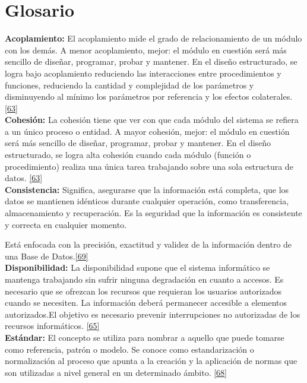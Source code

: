 
\chapter{Glosario}

\textbf {Acoplamiento:} 
El acoplamiento mide el grado de relacionamiento de un módulo con los demás. A menor acoplamiento, mejor: el módulo en cuestión será más sencillo de diseñar, programar, probar y mantener.
En el diseño estructurado, se logra bajo acoplamiento reduciendo las interacciones entre procedimientos y funciones, reduciendo la cantidad y complejidad de los parámetros y disminuyendo al mínimo los parámetros por referencia y los efectos colaterales. \hyperlink{b63}{[63]}\\

\textbf {Cohesión:}
La cohesión tiene que ver con que cada módulo del sistema se refiera a un único proceso o entidad. A mayor cohesión, mejor: el módulo en cuestión será más sencillo de diseñar, programar, probar y mantener.
En el diseño estructurado, se logra alta cohesión cuando cada módulo (función o procedimiento) realiza una única tarea trabajando sobre una sola estructura de datos. \hyperlink{b63}{[63]}\\

\textbf {Consistencia:}
Significa, asegurarse que la información está completa, que los datos se mantienen idénticos durante cualquier operación, como transferencia, almacenamiento y recuperación. Es la seguridad que la información es consistente y correcta en cualquier momento.

Está enfocada con la precisión, exactitud y validez de la información dentro de una Base de Datos.\hyperlink{b69}{[69]}\\

\textbf {Disponibilidad:} La disponibilidad supone que el sistema informático se mantenga trabajando sin sufrir ninguna degradación en cuanto a accesos. Es necesario que se ofrezcan los recursos que requieran los usuarios autorizados cuando se necesiten. La información deberá permanecer accesible a elementos autorizados.El objetivo es necesario prevenir interrupciones no autorizadas de los recursos informáticos. \hyperlink{b65}{[65]}\\

\textbf {Estándar:} El concepto se utiliza para nombrar a aquello que puede tomarse como referencia, patrón o modelo. Se conoce como estandarización o normalización al proceso que apunta a la creación y la aplicación de normas que son utilizadas a nivel general en un determinado ámbito. \hyperlink{b68}{[68]}\\

